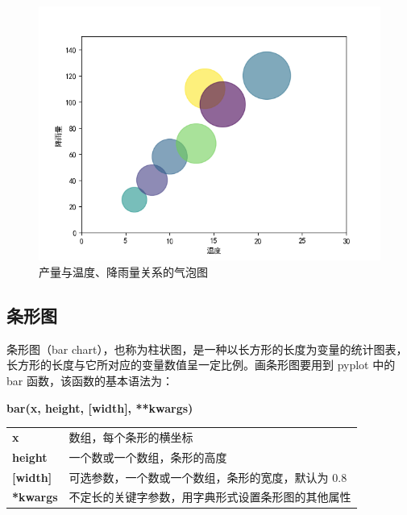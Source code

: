 \begin{figure}[!ht]
  \centering
  \includegraphics{figure/scatter2.png}
  \caption{产量与温度、降雨量关系的气泡图}\label{fig:scatter2}
\end{figure}

\clearpage

\subsection{条形图}

条形图（bar chart），也称为柱状图，是一种以长方形的长度为变量的统计图表，长方形的长度与它所对应的变量数值呈一定比例。画条形图要用到 pyplot 中的 bar 函数，该函数的基本语法为：

\begin{center}
\begin{tcolorbox}[title = bar 函数的语法]
\textbf{bar(x, height, [width],  **kwargs)}
\tcblower
\vspace{10pt}

\begin{tcboutputlisting}
\begin{tabular}{>{\bfseries}ll}
  x &数组，每个条形的横坐标\\
  height & 一个数或一个数组，条形的高度\\

[width] &可选参数，一个数或一个数组，条形的宽度，默认为 0.8\\

**kwargs &不定长的关键字参数，用字典形式设置条形图的其他属性
\end{tabular}
\end{tcboutputlisting}
\tcbuselistingtext
\end{tcolorbox}
\end{center}

